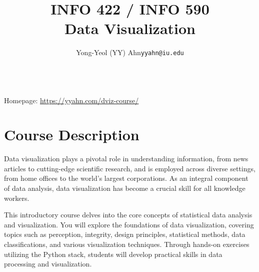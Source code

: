 \documentclass[11pt,article,oneside]{memoir} %
\makeatletter
\def\myauthor{Author}
\def\mytitle{Title}
\def\myaddress{\url{https://iu.zoom.us/my/yyahn}}
\def\myemail{yyahn@iu.edu}
\def\myauthor{Yong-Yeol (YY) Ahn}
\def\mytitle{{\normalsize INFO 422 / INFO 590} \\ \HUGE{} Data Visualization}
\makeatother
\begin{document}

\title{\LARGE \mytitle} %
\author{\Large\myauthor\newline \footnotesize\texttt{\noindent\myemail}}


\maketitle 

\vspace{-20pt}{Office hours \& TAs: see Canvas} \\
{Homepage: \url{https://yyahn.com/dviz-course/}}


\section{Course Description}%

Data visualization plays a pivotal role in understanding information, from news
articles to cutting-edge scientific research, and is employed across diverse
settings, from home offices to the world's largest corporations. As an integral
component of data analysis, data visualization has become a crucial skill for
all knowledge workers.

This introductory course delves into the core concepts of statistical data
analysis and visualization. You will explore the foundations of data
visualization, covering topics such as perception, integrity, design principles,
statistical methods, data classifications, and various visualization techniques.
Through hands-on exercises utilizing the Python stack, students will develop
practical skills in data processing and visualization.
\end{document}

